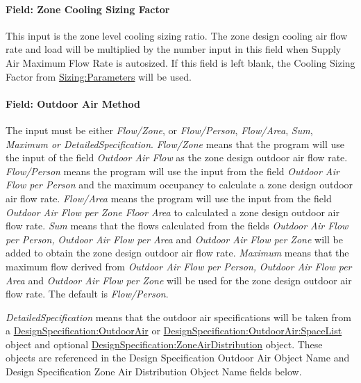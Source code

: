 \paragraph{Field: Zone Cooling Sizing Factor}\label{field-zone-cooling-sizing-factor-000}

This input is the zone level cooling sizing ratio. The zone design cooling air flow rate and load will be multiplied by the number input in this field when Supply Air Maximum Flow Rate is autosized. If this field is left blank, the Cooling Sizing Factor from \hyperref[sizingparameters]{Sizing:Parameters} will be used.

\paragraph{Field: Outdoor Air Method}\label{field-outdoor-air-method-2}

The input must be either \emph{Flow/Zone}, or \emph{Flow/Person}, \emph{Flow/Area}, \emph{Sum}, \emph{Maximum or DetailedSpecification}. \emph{Flow/Zone} means that the program will use the input of the field \emph{Outdoor Air Flow} as the zone design outdoor air flow rate. \emph{Flow/Person} means the program will use the input from the field \emph{Outdoor Air Flow per Person} and the maximum occupancy to calculate a zone design outdoor air flow rate. \emph{Flow/Area} means the program will use the input from the field \emph{Outdoor Air Flow per Zone Floor Area} to calculated a zone design outdoor air flow rate. \emph{Sum} means that the flows calculated from the fields \emph{Outdoor Air Flow per Person,} \emph{Outdoor Air Flow per Area} and \emph{Outdoor Air Flow per Zone} will be added to obtain the zone design outdoor air flow rate. \emph{Maximum} means that the maximum flow derived from \emph{Outdoor Air Flow per Person,} \emph{Outdoor Air Flow per Area} and \emph{Outdoor Air Flow per Zone} will be used for the zone design outdoor air flow rate. The default is \emph{Flow/Person}.

\emph{DetailedSpecification} means that the outdoor air specifications will be taken from a \hyperref[designspecificationoutdoorair]{DesignSpecification:OutdoorAir} or \hyperref[designspecificationoutdoorairspacelist]{DesignSpecification:OutdoorAir:SpaceList} object and optional \hyperref[designspecificationzoneairdistribution]{DesignSpecification:ZoneAirDistribution} object. These objects are referenced in the Design Specification Outdoor Air Object Name and Design Specification Zone Air Distribution Object Name fields below.

